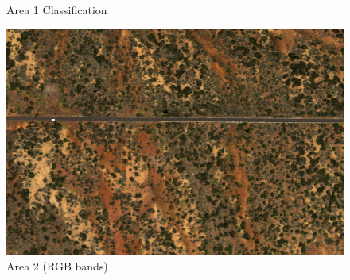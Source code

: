 \documentclass{beamer}
\begin{document}
\begin{frame}
\begin{figure}[ht]
\begin{minipage}[b]{0.30\linewidth}
      \caption{Area 1 Classification}
    \end{minipage}
    \hfill
    \begin{minipage}[b]{0.30\linewidth}
      \centering
      \includegraphics[width=\textwidth]{./Images/EdurneAreas/Area1.png}
      \caption{Area 2 (RGB bands)}
    \end{minipage}
  \end{figure}      
\end{frame}

\end{document}
